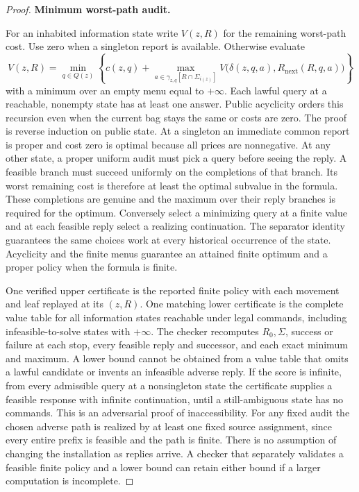 \begin{proof}
\textbf{Minimum worst-path audit.}

For an inhabited information state write \(V(z,R)\) for the remaining worst-path cost. Use zero when a singleton report is available. Otherwise evaluate
\[
 V(z,R)=\min_{q\in Q(z)}
    \left\{c(z,q)+
       \max_{a\in\gamma_{z,q}[R\cap\Sigma_{i(z)}]}
                   V\bigl(\delta(z,q,a),R_{\mathrm{next}}(R,q,a)\bigr)
    \right\}
\]
with a minimum over an empty menu equal to \(+\infty\). Each lawful query at a reachable, nonempty state has at least one answer. Public acyclicity orders this recursion even when the current bag stays the same or costs are zero. The proof is reverse induction on public state. At a singleton an immediate common report is proper and cost zero is optimal because all prices are nonnegative. At any other state, a proper uniform audit must pick a query before seeing the reply. A feasible branch must succeed uniformly on the completions of that branch. Its worst remaining cost is therefore at least the optimal subvalue in the formula. These completions are genuine and the maximum over their reply branches is required for the optimum. Conversely select a minimizing query at a finite value and at each feasible reply select a realizing continuation. The separator identity guarantees the same choices work at every historical occurrence of the state. Acyclicity and the finite menus guarantee an attained finite optimum and a proper policy when the formula is finite.

One verified upper certificate is the reported finite policy with each movement and leaf replayed at its \((z,R)\). One matching lower certificate is the complete value table for all information states reachable under legal commands, including infeasible-to-solve states with \(+\infty\). The checker recomputes \(R_0,\Sigma\), success or failure at each stop, every feasible reply and successor, and each exact minimum and maximum. A lower bound cannot be obtained from a value table that omits a lawful candidate or invents an infeasible adverse reply. If the score is infinite, from every admissible query at a nonsingleton state the certificate supplies a feasible response with infinite continuation, until a still-ambiguous state has no commands. This is an adversarial proof of inaccessibility. For any fixed audit the chosen adverse path is realized by at least one fixed source assignment, since every entire prefix is feasible and the path is finite. There is no assumption of changing the installation as replies arrive. A checker that separately validates a feasible finite policy and a lower bound can retain either bound if a larger computation is incomplete.


\end{proof}
